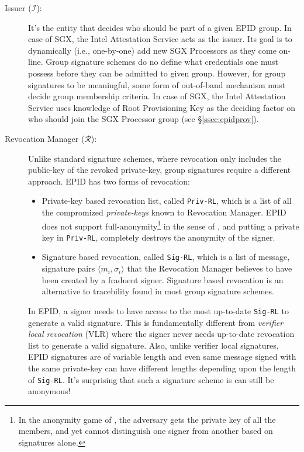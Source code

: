 \documentclass[10pt, letterpaper]{article}
\newcommand{\secref}[1]{\S\ref{#1}}
\begin{document}
  \begin{description}
  \item [Issuer ($\mathcal{I}$):] It's the entity that decides who
    should be part of a given EPID group. In case of SGX, the Intel
    Attestation Service acts as the issuer. Its goal is to dynamically
    (i.e., one-by-one) add new SGX Processors as they come
    on-line. Group signature schemes do no define what credentials one
    must possess before they can be admitted to given group. However,
    for group signatures to be meaningful, some form of out-of-band
    mechanism must decide group membership criteria. In case of SGX,
    the Intel Attestation Service uses knowledge of Root Provisioning
    Key as the deciding factor on who should join the SGX Processor
    group (see \secref{ssec:epidprov}).

  \item[Revocation Manager ($\mathcal{R}$):] Unlike standard signature
    schemes, where revocation only includes the public-key of the
    revoked private-key, group signatures require a different
    approach. EPID has two forms of revocation:

    \begin{itemize}
    \item Private-key based revocation list, called \texttt{Priv-RL},
      which is a list of all the compromized \textit{private-keys}
      known to Revocation Manager. EPID does not support
      full-anonymity\footnote{In the \textsf{anonymity} game of
        \cite{BMW03}, the adversary gets the private key of all the
        members, and yet cannot distinguish one signer from another
        based on signatures alone.} in the sense of \cite{BMW03}, and
      putting a private key in \texttt{Priv-RL}, completely destroys
      the anonymity of the signer.
      \item Signature based revocation, called \texttt{Sig-RL}, which
        is a list of message, signature pairs $\langle m_i, \sigma_i
        \rangle$ that the Revocation Manager believes to have been
        created by a fraduent signer. Signature based revocation is an
        alternative to tracebility found in most group signature
        schemes.
    \end{itemize}

    In EPID, a signer needs to have access to the most up-to-date
    \texttt{Sig-RL} to generate a valid signature. This is
    fundamentally different from \textit{verifier local revocation}
    (VLR) \cite{BonehVLR} where the signer never needs up-to-date
    revocation list to generate a valid signature. Also, unlike
    verifier local signatures, EPID signatures are of variable length
    and even same message signed with the same private-key can have
    different lengths depending upon the length of
    \texttt{Sig-RL}. It's surprising that such a signature scheme is
    can still be anonymous!


\end{description}
\end{document}
